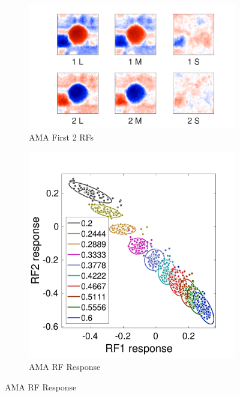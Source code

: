 \documentclass{jov}
\begin{document}
\begin{figure}
\centering
    \begin{subfigure}[b]{0.27 \textwidth}   
        \includegraphics[width=\textwidth]{../Figures/Figure11/Figure11_a.pdf}
        \caption{AMA First 2 RFs}
        \label{fig:case10AMA}
    \end{subfigure}
        \begin{subfigure}[b]{0.20 \textwidth}
        \includegraphics[width=\textwidth]{../Figures/Figure11/Figure11_b.pdf}
        \caption{AMA RF Response}
        \label{fig:case10FiltersResponse}
    \end{subfigure}    

\end{figure}
\end{document}
